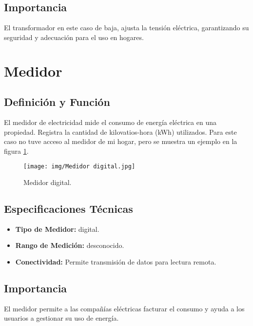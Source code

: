 \documentclass[conference]{IEEEtran}
\theoremstyle{mytheoremstyle}
\theoremstyle{mytheoremstyle}
\theoremstyle{myproblemstyle}
\begin{document}
        \subsection{Importancia}
        El transformador en este caso de baja, ajusta la tensión eléctrica, garantizando su seguridad y adecuación para el uso en hogares.
        
        \section{Medidor}
        
        \subsection{Definición y Función}
        El medidor de electricidad mide el consumo de energía eléctrica en una propiedad. Registra la cantidad de kilovatios-hora (kWh) utilizados. Para este caso no tuve acceso al medidor de mi hogar, pero se muestra un ejemplo en la figura \ref{fig:medidor}.
        
        \begin{figure}[h] %
            \centering
            \texttt{[image: img/Medidor digital.jpg]} %
            \caption{Medidor digital.}
            \label{fig:medidor}
        \end{figure}



        \subsection{Especificaciones Técnicas}
        \begin{itemize}
            \item \textbf{Tipo de Medidor:} digital.
            \item \textbf{Rango de Medición:} desconocido.
            \item \textbf{Conectividad:} Permite transmisión de datos para lectura remota.
        \end{itemize}
        
        \subsection{Importancia}
        El medidor permite a las compañías eléctricas facturar el consumo y ayuda a los usuarios a gestionar su uso de energía.
        
\end{document}
